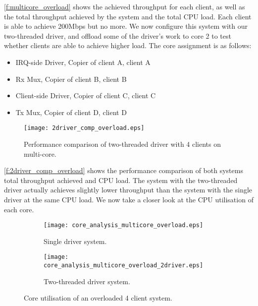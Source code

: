 \autoref{f:multicore_overload} shows the achieved throughput for each client, as well as the total throughput achieved 
by the system and the total CPU load. Each client is able to achieve 200Mbps but no more. We now configure this system 
with our two-threaded driver, and offload some of the driver's work to core 2 to test whether clients are able to 
achieve higher load. The core assignment is as follows:

\begin{itemize}
    \item[      \textbf{Core 0:}] IRQ-side Driver, Copier of client A, client A
    \item[      \textbf{Core 1:}] Rx Mux, Copier of client B, client B
    \item[      \textbf{Core 2:}] Client-side Driver, Copier of client C, client C
    \item[      \textbf{Core 3:}] Tx Mux, Copier of client D, client D
\end{itemize}

\begin{figure}[h]
    \centering
    \texttt{[image: 2driver\_comp\_overload.eps]}
    \caption{Performance comparison of two-threaded driver with 4 clients on multi-core.}
    \label{f:2driver_comp_overload}
\end{figure}

\autoref{f:2driver_comp_overload} shows the performance comparison of both systems total throughput achieved and CPU load. 
The system with the two-threaded driver actually achieves slightly lower throughput than the system with the single driver
at the same CPU load. We now take a closer look at the CPU utilisation of each core.

\noindent\begin{figure}[H]
    \centering
	\begin{multicols}{2}
	\begin{subfigure}[b]{0.45\textwidth}
        \centering
        \texttt{[image: core\_analysis\_multicore\_overload.eps]}
        \caption{Single driver system.}
        \label{f:core_analysis_mutlicore_overload}
    \end{subfigure}\qquad
    \begin{subfigure}[b]{0.45\textwidth}
        \centering
        \texttt{[image: core\_analysis\_multicore\_overload\_2driver.eps]}
        \caption{Two-threaded driver system.}
        \label{f:core_analysis_mutlicore_overload_2driver}
    \end{subfigure}
\end{multicols}
\caption{Core utilisation of an overloaded 4 client system.}
\label{f:core_util_multi}
\end{figure}

